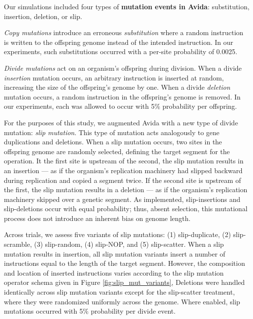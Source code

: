 

Our simulations included four types of \textbf{mutation events in Avida}: substitution, insertion, deletion, or slip.

\textit{Copy mutations} introduce an erroneous \textit{substitution} where a random instruction is written to the offspring genome instead of the intended instruction.
In our experiments, such substitutions occurred with a per-site probability of 0.0025.

\textit{Divide mutations} act on an organism's offspring during division.
When a divide \textit{insertion} mutation occurs, an arbitrary instruction is inserted at random, increasing the size of the offspring's genome by one.
When a divide \textit{deletion} mutation occurs, a random instruction in the offspring's genome is removed.
In our experiments, each was allowed to occur with 5\% probability per offspring.

For the purposes of this study, we augmented Avida with a new type of divide mutation: \textit{slip mutation}.
This type of mutation acts analogously to gene duplications and deletions.
When a slip mutation occurs, two sites in the offspring genome are randomly selected, defining the target segment for the operation.
It the first site is upstream of the second, the slip mutation results in an insertion --- as if the organism's replication machinery had slipped backward during replication and copied a segment twice.
If the second site is upstream of the first, the slip mutation results in a deletion --- as if the organism's replication machinery skipped over a genetic segment.
As implemented, slip-insertions and slip-deletions occur with equal probability; thus, absent selection, this mutational process does not introduce an inherent bias on genome length.

Across trials, we assess five variants of slip mutations: (1) slip-duplicate, (2) slip-scramble, (3) slip-random, (4) slip-NOP, and (5) slip-scatter.
When a slip mutation results in insertion, all slip mutation variants insert a number of instructions equal to the length of the target segment.
However, the composition and location of inserted instructions varies according to the slip mutation operator schema given in Figure \ref{fig:slip_mut_variants},
Deletions were handled identically across slip mutation variants except for the slip-scatter treatment, where they were randomized uniformly across the genome.
Where enabled, slip mutations occurred with 5\% probability per divide event.

